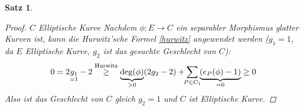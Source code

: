 \documentclass[english, german, parskip=half]{scrartcl}
\newtheorem{Satz}{Satz}[section]
\theoremstyle{definition}
\theoremstyle{remark}
\begin{document}
\begin{Satz}
\begin{proof}
  \item[$C$ Elliptische Kurve]
    Nachdem $\phi\colon E\to C$ ein separabler Morphismus glatter
    Kurven ist, kann die Hurwitz'sche Formel \autoref{hurwitz}
    angewendet werden ($g_1=1$, da $E$ Elliptische Kurve, $g_2$ ist das
    gesuchte Geschlecht von $C$):
    \begin{align*}
      0
      = 2\underset{=1}{g_1}-2
      &\overset{\text{Hurwitz}}{\geq}
      \underbrace{\deg(\phi)}_{>0} (2g_2-2) 
      + \sum_{\mathclap{P\in C_1}}\underbrace{(e_P(\phi)-1)}_{=0}
       \geq 0\\
    \end{align*}
    Also ist das Geschlecht von $C$ gleich $g_2=1$ und $C$ ist
    Elliptische Kurve.
  \end{proof}

\end{Satz}


\printbibliography
\end{document}
